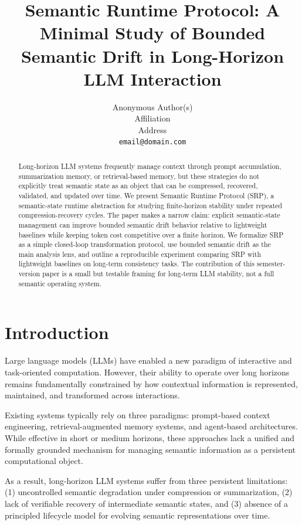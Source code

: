 \documentclass[11pt]{article}
\title{Semantic Runtime Protocol: A Minimal Study of Bounded Semantic Drift in Long-Horizon LLM Interaction}
\author{Anonymous Author(s)\\
  Affiliation\\
  Address\\
  \texttt{email@domain.com}}
\begin{document}
\maketitle


\begin{abstract}
Long-horizon LLM systems frequently manage context through prompt accumulation, summarization memory, or retrieval-based memory, but these strategies do not explicitly treat semantic state as an object that can be compressed, recovered, validated, and updated over time. We present Semantic Runtime Protocol (SRP), a semantic-state runtime abstraction for studying finite-horizon stability under repeated compression-recovery cycles. The paper makes a narrow claim: explicit semantic-state management can improve bounded semantic drift behavior relative to lightweight baselines while keeping token cost competitive over a finite horizon. We formalize SRP as a simple closed-loop transformation protocol, use bounded semantic drift as the main analysis lens, and outline a reproducible experiment comparing SRP with lightweight baselines on long-term consistency tasks. The contribution of this semester-version paper is a small but testable framing for long-term LLM stability, not a full semantic operating system.
\end{abstract}

\section{Introduction}
Large language models (LLMs) have enabled a new paradigm of interactive and task-oriented computation. However, their ability to operate over long horizons remains fundamentally constrained by how contextual information is represented, maintained, and transformed across interactions.

Existing systems typically rely on three paradigms: prompt-based context engineering, retrieval-augmented memory systems, and agent-based architectures. While effective in short or medium horizons, these approaches lack a unified and formally grounded mechanism for managing semantic information as a persistent computational object.

As a result, long-horizon LLM systems suffer from three persistent limitations: (1) uncontrolled semantic degradation under compression or summarization, (2) lack of verifiable recovery of intermediate semantic states, and (3) absence of a principled lifecycle model for evolving semantic representations over time.
\end{document}

